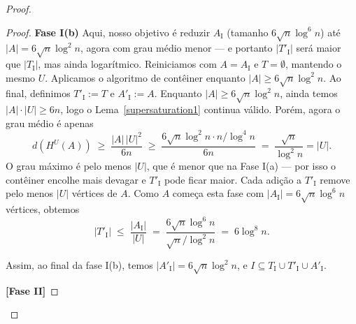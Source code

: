 \documentclass[reqno,a4paper,12pt]{amsart}
\begin{document}
\begin{proof}
\begin{proof}
    \textbf{Fase I(b)}
    Aqui, nosso objetivo é reduzir $A_{\mathrm{I}}$ (tamanho $6\sqrt{n}\log^6 n$) até
    $|A| = 6\sqrt{n}\log^2 n$, agora com grau médio menor — e portanto $|T'_{\mathrm{I}}|$ será maior
    que $|T_{\mathrm{I}}|$, mas ainda logarítmico.
    Reiniciamos com $A = A_{\mathrm{I}}$ e $T = \emptyset$, mantendo o mesmo $U$.
    Aplicamos o algoritmo de contêiner enquanto $|A| \geq 6\sqrt{n}\log^2 n$. Ao final, definimos
    $T'_{\mathrm{I}} := T$ e $A'_{\mathrm{I}} := A$.
    Enquanto $|A| \geq 6\sqrt{n}\log^2 n$, ainda temos $|A| \cdot |U| \geq 6n$, logo o Lema~\ref{supersaturation1}
    continua válido. Porém, agora o grau médio é apenas
    \[
      d(H^U(A)) \;\geq\; \frac{|A|\,|U|^2}{6n}
      \;\geq\; \frac{6\sqrt{n}\log^2 n \cdot n/\log^4 n}{6n}
      \;=\; \frac{\sqrt{n}}{\log^2 n} = |U|.
    \]
    O grau máximo é pelo menos $|U|$, que é menor que na Fase I(a) — por isso o contêiner encolhe
    mais devagar e $T'_{\mathrm{I}}$ pode ficar maior.
    Cada adição a $T'_{\mathrm{I}}$ remove pelo menos $|U|$ vértices de $A$. Como $A$ começa esta fase
    com $|A_{\mathrm{I}}| = 6\sqrt{n}\log^6 n$ vértices, obtemos
    \[
      |T'_{\mathrm{I}}| \;\leq\; \frac{|A_{\mathrm{I}}|}{|U|}
      \;=\; \frac{6\sqrt{n}\log^6 n}{\sqrt{n}/\log^2 n}
      \;=\; 6\log^8 n.
    \]

    \medskip
    Assim, ao final da fase I(b), temos $|A'_{\mathrm{I}}| = 6\sqrt{n}\log^2 n$, e $I \subseteq T_{\mathrm{I}} \cup T'_{\mathrm{I}}
      \cup A'_{\mathrm{I}}$.


    \textbf{[Fase II]}


\end{proof}
\end{proof}
\end{document}
